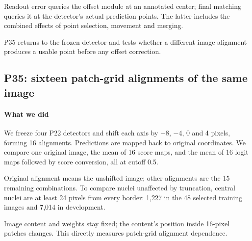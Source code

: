 \documentclass[
  12pt,
]{article}
\begin{document}
Readout error queries the offset module at an annotated center; final matching queries it at the detector’s actual prediction points. The latter includes the combined effects of point selection, movement and merging.

P35 returns to the frozen detector and tests whether a different image alignment produces a usable point before any offset correction.

\subsection{P35: sixteen patch-grid alignments of the same image}\label{chapter16}
\paragraph{What we did}
We freeze four P22 detectors and shift each axis by \ensuremath{-}8, \ensuremath{-}4, 0 and 4 pixels, forming 16 alignments. Predictions are mapped back to original coordinates. We compare one original image, the mean of 16 score maps, and the mean of 16 logit maps followed by score conversion, all at cutoff 0.5.

Original alignment means the unshifted image; other alignments are the 15 remaining combinations. To compare nuclei unaffected by truncation, central nuclei are at least 24 pixels from every border: 1,227 in the 48 selected training images and 7,014 in development.

\begin{center}\end{center}
Image content and weights stay fixed; the content’s position inside 16-pixel patches changes. This directly measures patch-grid alignment dependence.
\end{document}
